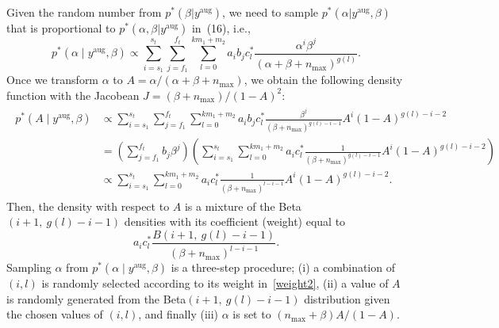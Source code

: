 \documentclass[12pt]{article}
\begin{document}
\begin{appendix}
Given the random number from $p^\ast(\beta\vert y^{\textrm{aug}})$, we need to sample  $p^\ast(\alpha\vert y^{\textrm{aug}}, \beta)$ that is proportional to $p^\ast(\alpha, \beta \vert y^{\textrm{aug}})$ in~(16), i.e., 
$$
p^\ast(\alpha\mid y^{\textrm{aug}}, \beta)\propto\sum_{i=s_1}^{s_t}\sum_{j=f_1}^{f_t} \sum_{l=0}^{km_1+m_2}a_ib_jc^\ast_l\frac{\alpha^i\beta^j}{(\alpha+\beta+n_{\textrm{max}})^{g(l)}}.
$$
Once we transform $\alpha$ to $A=\alpha/(\alpha+\beta+n_{\textrm{max}})$, we obtain the following density function with the Jacobean $J=(\beta+n_{\textrm{max}}) / (1-A)^2$:
\begin{align}
\begin{aligned}
p^\ast(A\mid y^{\textrm{aug}}, \beta)&\propto\sum_{i=s_1}^{s_t}\sum_{j=f_1}^{f_t}\sum_{l=0}^{km_1+m_2}a_ib_jc^\ast_l\frac{\beta^j}{(\beta+n_{\textrm{max}})^{g(l)-i-1}}A^i(1-A)^{g(l)-i-2}\\
&=\left(\sum_{j=f_1}^{f_t}b_j\beta^j\right)\left(\sum_{i=s_1}^{s_t}\sum_{l=0}^{km_1+m_2}a_ic^\ast_l\frac{1}{(\beta+n_{\textrm{max}})^{g(l)-i-1}}A^i(1-A)^{g(l)-i-2}\right)\\
&\propto\sum_{i=s_1}^{s_t}\sum_{l=0}^{km_1+m_2}a_ic^\ast_l\frac{1}{(\beta+n_{\textrm{max}})^{l-i-1}}A^i(1-A)^{g(l)-i-2}.
\end{aligned}
\end{align}
Then, the density with respect to $A$ is a mixture of the Beta$(i+1,~ g(l)-i-1)$ densities with its coefficient (weight) equal to
\begin{equation}\label{weight2}
a_ic^\ast_l\frac{B(i+1,~ g(l)-i-1)}{(\beta+n_{\textrm{max}})^{l-i-1}}.
\end{equation}
Sampling $\alpha$ from $p^\ast(\alpha\mid y^{\textrm{aug}}, \beta)$ is a three-step procedure; (i) a combination of $(i, l)$ is randomly selected according to its weight in~\eqref{weight2},  (ii) a value of $A$ is randomly generated from the Beta$(i+1,~ g(l)-i-1)$ distribution given the chosen values of $(i, l)$, and finally (iii) $\alpha$ is set to $(n_{\textrm{max}}+\beta)A/(1-A)$.




\end{appendix}
\end{document}
